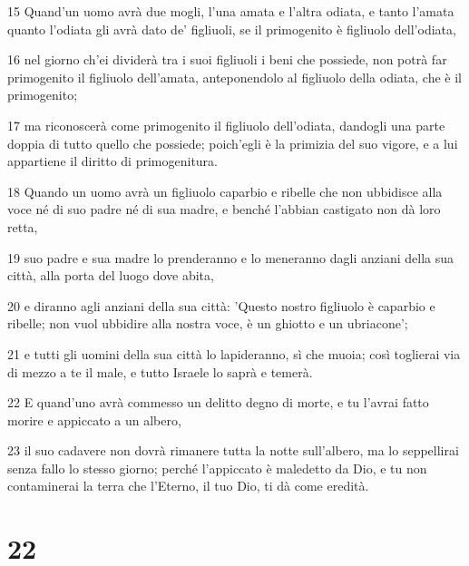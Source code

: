 \par 15 Quand'un uomo avrà due mogli, l'una amata e l'altra odiata, e tanto l'amata quanto l'odiata gli avrà dato de' figliuoli, se il primogenito è figliuolo dell'odiata,
\par 16 nel giorno ch'ei dividerà tra i suoi figliuoli i beni che possiede, non potrà far primogenito il figliuolo dell'amata, anteponendolo al figliuolo della odiata, che è il primogenito;
\par 17 ma riconoscerà come primogenito il figliuolo dell'odiata, dandogli una parte doppia di tutto quello che possiede; poich'egli è la primizia del suo vigore, e a lui appartiene il diritto di primogenitura.
\par 18 Quando un uomo avrà un figliuolo caparbio e ribelle che non ubbidisce alla voce né di suo padre né di sua madre, e benché l'abbian castigato non dà loro retta,
\par 19 suo padre e sua madre lo prenderanno e lo meneranno dagli anziani della sua città, alla porta del luogo dove abita,
\par 20 e diranno agli anziani della sua città: 'Questo nostro figliuolo è caparbio e ribelle; non vuol ubbidire alla nostra voce, è un ghiotto e un ubriacone';
\par 21 e tutti gli uomini della sua città lo lapideranno, sì che muoia; così toglierai via di mezzo a te il male, e tutto Israele lo saprà e temerà.
\par 22 E quand'uno avrà commesso un delitto degno di morte, e tu l'avrai fatto morire e appiccato a un albero,
\par 23 il suo cadavere non dovrà rimanere tutta la notte sull'albero, ma lo seppellirai senza fallo lo stesso giorno; perché l'appiccato è maledetto da Dio, e tu non contaminerai la terra che l'Eterno, il tuo Dio, ti dà come eredità.

\chapter{22}

